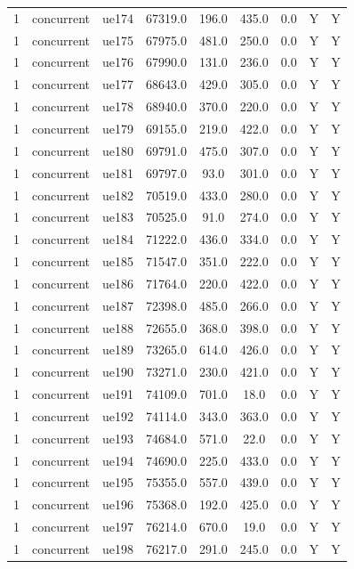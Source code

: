 \begin{table}[ht]
\begin{tabular}{|c|c|c|c|c|c|c|c|c|}
1 & concurrent & ue174 & 67319.0 & 196.0 & 435.0 & 0.0 & Y & Y \\
1 & concurrent & ue175 & 67975.0 & 481.0 & 250.0 & 0.0 & Y & Y \\
1 & concurrent & ue176 & 67990.0 & 131.0 & 236.0 & 0.0 & Y & Y \\
1 & concurrent & ue177 & 68643.0 & 429.0 & 305.0 & 0.0 & Y & Y \\
1 & concurrent & ue178 & 68940.0 & 370.0 & 220.0 & 0.0 & Y & Y \\
1 & concurrent & ue179 & 69155.0 & 219.0 & 422.0 & 0.0 & Y & Y \\
1 & concurrent & ue180 & 69791.0 & 475.0 & 307.0 & 0.0 & Y & Y \\
1 & concurrent & ue181 & 69797.0 & 93.0 & 301.0 & 0.0 & Y & Y \\
1 & concurrent & ue182 & 70519.0 & 433.0 & 280.0 & 0.0 & Y & Y \\
1 & concurrent & ue183 & 70525.0 & 91.0 & 274.0 & 0.0 & Y & Y \\
1 & concurrent & ue184 & 71222.0 & 436.0 & 334.0 & 0.0 & Y & Y \\
1 & concurrent & ue185 & 71547.0 & 351.0 & 222.0 & 0.0 & Y & Y \\
1 & concurrent & ue186 & 71764.0 & 220.0 & 422.0 & 0.0 & Y & Y \\
1 & concurrent & ue187 & 72398.0 & 485.0 & 266.0 & 0.0 & Y & Y \\
1 & concurrent & ue188 & 72655.0 & 368.0 & 398.0 & 0.0 & Y & Y \\
1 & concurrent & ue189 & 73265.0 & 614.0 & 426.0 & 0.0 & Y & Y \\
1 & concurrent & ue190 & 73271.0 & 230.0 & 421.0 & 0.0 & Y & Y \\
1 & concurrent & ue191 & 74109.0 & 701.0 & 18.0 & 0.0 & Y & Y \\
1 & concurrent & ue192 & 74114.0 & 343.0 & 363.0 & 0.0 & Y & Y \\
1 & concurrent & ue193 & 74684.0 & 571.0 & 22.0 & 0.0 & Y & Y \\
1 & concurrent & ue194 & 74690.0 & 225.0 & 433.0 & 0.0 & Y & Y \\
1 & concurrent & ue195 & 75355.0 & 557.0 & 439.0 & 0.0 & Y & Y \\
1 & concurrent & ue196 & 75368.0 & 192.0 & 425.0 & 0.0 & Y & Y \\
1 & concurrent & ue197 & 76214.0 & 670.0 & 19.0 & 0.0 & Y & Y \\
1 & concurrent & ue198 & 76217.0 & 291.0 & 245.0 & 0.0 & Y & Y \\

\end{tabular}
\end{table}
